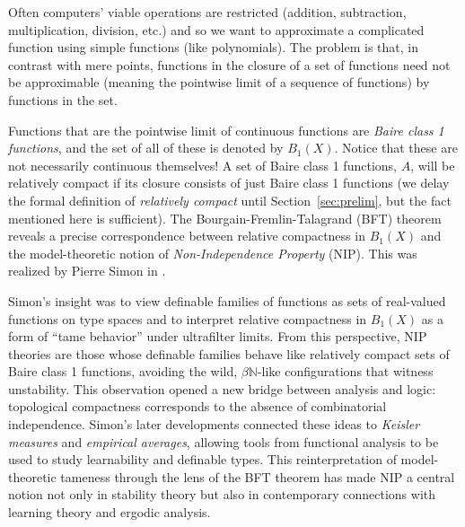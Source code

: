 \documentclass[psamsfonts]{amsart}
\theoremstyle{definition}
\theoremstyle{remark}
\numberwithin{equation}{section}
\begin{document}
Often computers' viable operations are restricted (addition, subtraction, multiplication, division, etc.) and so we want to approximate a complicated function using simple functions (like polynomials). The problem is that, in contrast with mere points, functions in the closure of a set of functions need not be approximable (meaning the pointwise limit of a sequence of functions) by functions in the set.

Functions that are the pointwise limit of continuous functions are \emph{Baire class 1 functions}, and the set of all of these is denoted by $B_1(X)$. Notice that these are not necessarily continuous themselves! A set of Baire class 1 functions, $A$, will be relatively compact if its closure consists of just Baire class 1 functions (we delay the formal definition of \emph{relatively compact} until Section~\ref{sec:prelim}, but the fact mentioned here is sufficient). The Bourgain-Fremlin-Talagrand (BFT) theorem reveals a precise correspondence between relative compactness in $B_1(X)$ and the model-theoretic notion of \emph{Non-Independence Property} (NIP). This was realized by Pierre Simon in \cite{Simon_2015_RosenthalNIP}. 

Simon's insight was to view definable families of functions as sets of real-valued functions on type spaces and to interpret relative compactness in $B_1(X)$ as a form of ``tame behavior'' under ultrafilter limits. From this perspective, NIP theories are those whose definable families behave like relatively compact sets of Baire class 1 functions, avoiding the wild, $\beta\mathbb N$-like configurations that witness unstability. This observation opened a new bridge between analysis and logic: topological compactness corresponds to the absence of combinatorial independence. Simon's later developments connected these ideas to \emph{Keisler measures} and \emph{empirical averages}, allowing tools from functional analysis to be used to study learnability and definable types. This reinterpretation of model-theoretic tameness through the lens of the BFT theorem has made NIP a central notion not only in stability theory but also in contemporary connections with learning theory and ergodic analysis.
\end{document}
